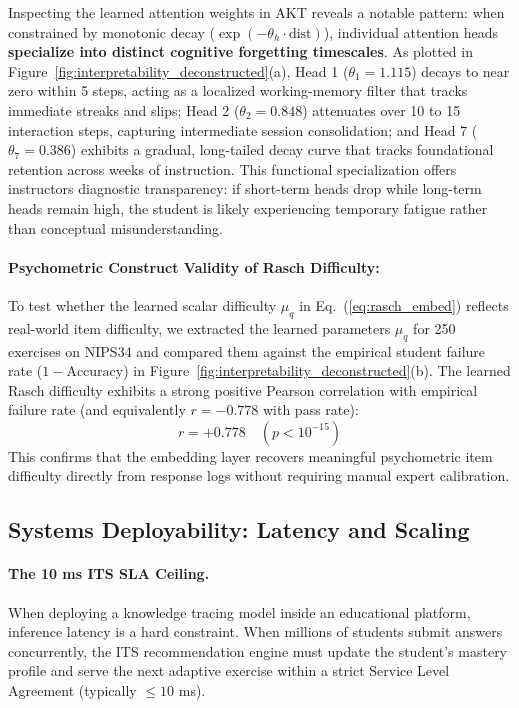 \documentclass[11pt]{article}
\begin{document}
Inspecting the learned attention weights in \textsc{AKT} reveals a notable pattern: when constrained by monotonic decay ($\exp(-\theta_h \cdot \text{dist})$), individual attention heads \textbf{specialize into distinct cognitive forgetting timescales}. As plotted in Figure~\ref{fig:interpretability_deconstructed}(a), Head 1 ($\theta_1 = 1.115$) decays to near zero within 5 steps, acting as a localized working-memory filter that tracks immediate streaks and slips; Head 2 ($\theta_2 = 0.848$) attenuates over 10 to 15 interaction steps, capturing intermediate session consolidation; and Head 7 ($\theta_7 = 0.386$) exhibits a gradual, long-tailed decay curve that tracks foundational retention across weeks of instruction. This functional specialization offers instructors diagnostic transparency: if short-term heads drop while long-term heads remain high, the student is likely experiencing temporary fatigue rather than conceptual misunderstanding.

\paragraph{Psychometric Construct Validity of Rasch Difficulty:}
To test whether the learned scalar difficulty $\mu_q$ in Eq.~(\ref{eq:rasch_embed}) reflects real-world item difficulty, we extracted the learned parameters $\mu_q$ for 250 exercises on \textsc{NIPS34} and compared them against the empirical student failure rate ($1 - \text{Accuracy}$) in Figure~\ref{fig:interpretability_deconstructed}(b). The learned Rasch difficulty exhibits a strong positive Pearson correlation with empirical failure rate (and equivalently $r = -0.778$ with pass rate):
\begin{equation}
r = +0.778 \quad (p < 10^{-15})
\end{equation}
This confirms that the embedding layer recovers meaningful psychometric item difficulty directly from response logs without requiring manual expert calibration.

\subsection{Systems Deployability: Latency and Scaling}

\paragraph{The 10 ms ITS SLA Ceiling.}
When deploying a knowledge tracing model inside an educational platform, inference latency is a hard constraint. When millions of students submit answers concurrently, the ITS recommendation engine must update the student's mastery profile and serve the next adaptive exercise within a strict Service Level Agreement (typically $\le 10$ ms).
\end{document}
